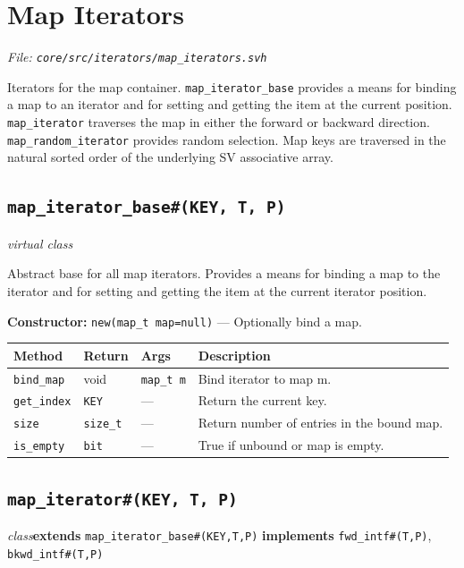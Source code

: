 \documentclass[11pt,letterpaper]{report}
\begin{document}
\section{Map Iterators}
\noindent\small\textit{File: \texttt{core/src/iterators/map\_iterators.svh}}\par

Iterators for the map container. \texttt{map\_iterator\_base} provides a means for binding a map to an iterator and for setting and getting the item at the current position. \texttt{map\_iterator} traverses the map in either the forward or backward direction. \texttt{map\_random\_iterator} provides random selection. Map keys are traversed in the natural sorted order of the underlying SV associative array.

\subsection*{\texttt{map\_iterator\_base\#(KEY, T, P)}}
\noindent\small\textit{virtual class}\par

Abstract base for all map iterators. Provides a means for binding a map to the iterator and for setting and getting the item at the current iterator position.

\noindent\textbf{Constructor:} \texttt{new(map\_t map=null)} --- Optionally bind a map.

\begin{xltabular}{\linewidth}{>{\small}p{1.35in} >{\small}p{1.25in} >{\small}p{0.95in} >{\small}X}
\toprule
\textbf{Method} & \textbf{Return} & \textbf{Args} & \textbf{Description} \\
\midrule
\endhead
\bottomrule
\endfoot
\texttt{bind\_map} & void & \texttt{map\_t m} & Bind iterator to map m. \\
\texttt{get\_index} & \texttt{KEY} & --- & Return the current key. \\
\texttt{size} & \texttt{size\_t} & --- & Return number of entries in the bound map. \\
\texttt{is\_empty} & \texttt{bit} & --- & True if unbound or map is empty. \\
\end{xltabular}

\subsection*{\texttt{map\_iterator\#(KEY, T, P)}}
\noindent\small\textit{class}\quad \textbf{extends} \texttt{map\_iterator\_base\#(KEY,T,P)} \quad \textbf{implements} \texttt{fwd\_intf\#(T,P)}, \texttt{bkwd\_intf\#(T,P)}\par
\end{document}
